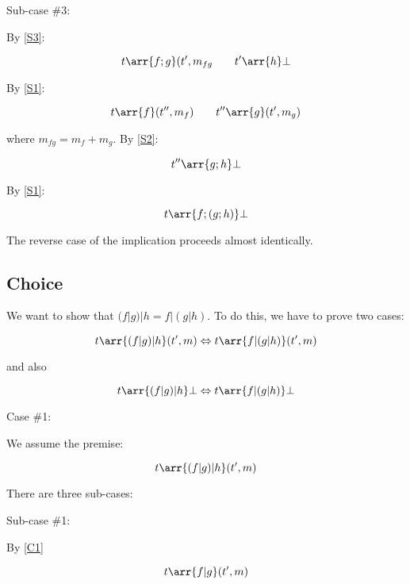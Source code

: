 Sub-case \#3:

By \eqref{S3}:

\begin{equation}
t \arr{f;g} (t',m_{fg} \qquad t' \arr{h} \bot
\end{equation}

By \eqref{S1}:

\begin{equation}
t \arr{f} (t'',m_f) \qquad t'' \arr{g} (t',m_g)
\end{equation}

where $m_{fg} = m_f + m_g$. By \eqref{S2}:

\begin{equation}
t'' \arr{g;h} \bot
\end{equation}

By \eqref{S1}:

\begin{equation}
t \arr{f;(g;h)} \bot
\end{equation}

The reverse case of the implication proceeds almost identically.


\subsection{Choice}
\label{sec:choice-assoc}

We want to show that $(f|g)|h = f|(g|h)$. To do this, we have to
prove two cases:

\begin{equation}
t \arr{(f|g)|h} (t',m) \Leftrightarrow t \arr{f|(g|h)} (t',m)
\end{equation}

and also

\begin{equation}
t \arr{(f|g)|h} \bot \Leftrightarrow t \arr{f|(g|h)} \bot
\end{equation}

Case \#1:

We assume the premise:

\begin{equation}
t \arr{(f|g)|h} (t',m)
\end{equation}

There are three sub-cases:

Sub-case \#1:

By \eqref{C1}

\begin{equation}
t \arr{f|g} (t',m)
\end{equation}

